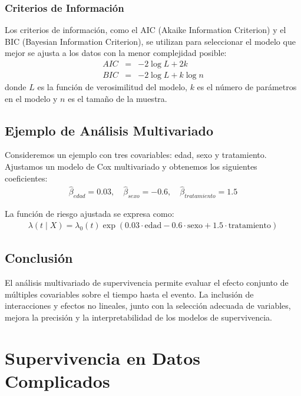\documentclass[a4paper]{report} %
\begin{document}
\subsection{Criterios de Informaci\'on}
Los criterios de informaci\'on, como el AIC (Akaike Information Criterion) y el BIC (Bayesian Information Criterion), se utilizan para seleccionar el modelo que mejor se ajusta a los datos con la menor complejidad posible:
\begin{eqnarray*}
AIC &=& -2 \log L + 2k \\
BIC &=& -2 \log L + k \log n
\end{eqnarray*}
donde $L$ es la funci\'on de verosimilitud del modelo, $k$ es el n\'umero de par\'ametros en el modelo y $n$ es el tama\~no de la muestra.

\section{Ejemplo de An\'alisis Multivariado}
Consideremos un ejemplo con tres covariables: edad, sexo y tratamiento. Ajustamos un modelo de Cox multivariado y obtenemos los siguientes coeficientes:
\begin{eqnarray*}
\hat{\beta}_{edad} = 0.03, \quad \hat{\beta}_{sexo} = -0.6, \quad \hat{\beta}_{tratamiento} = 1.5
\end{eqnarray*}

La funci\'on de riesgo ajustada se expresa como:
\begin{eqnarray*}
\lambda(t \mid X) = \lambda_0(t) \exp(0.03 \cdot \text{edad} - 0.6 \cdot \text{sexo} + 1.5 \cdot \text{tratamiento})
\end{eqnarray*}

\section{Conclusi\'on}
El an\'alisis multivariado de supervivencia permite evaluar el efecto conjunto de m\'ultiples covariables sobre el tiempo hasta el evento. La inclusi\'on de interacciones y efectos no lineales, junto con la selecci\'on adecuada de variables, mejora la precisi\'on y la interpretabilidad de los modelos de supervivencia.


\chapter{Supervivencia en Datos Complicados}
\end{document}

